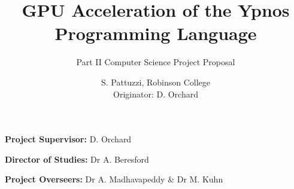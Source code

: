 \documentclass[12pt,a4,parskip=full]{scrartcl}
\begin{document}
\subtitle{Part II Computer Science Project Proposal}
\title{GPU Acceleration of the Ypnos Programming Language}
\author{
S. Pattuzzi, Robinson College\\
Originator: D. Orchard
}

\maketitle

\noindent
\textbf{Project Supervisor:} D. Orchard
\vspace{0.2in}

\noindent
\textbf{Director of Studies:} Dr A. Beresford
\vspace{0.2in}
\noindent
 
\noindent
\textbf{Project Overseers:} Dr A. Madhavapeddy \& Dr M. Kuhn


\end{document}
